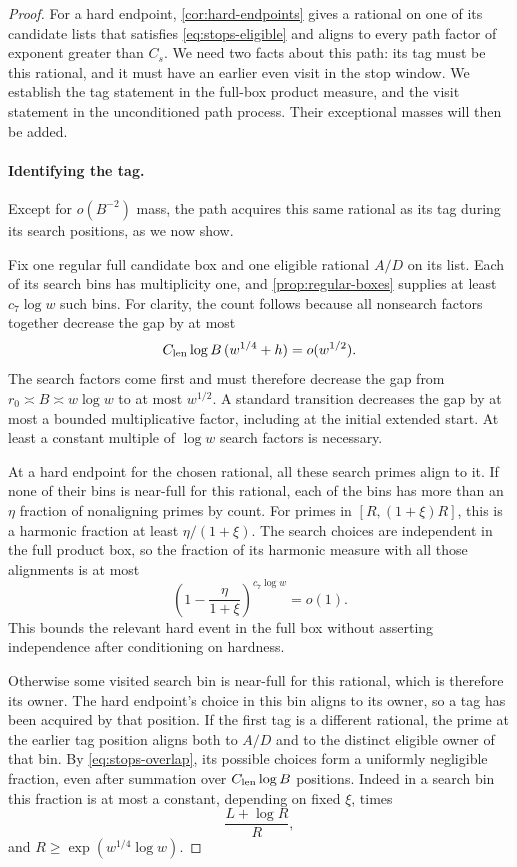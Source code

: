 \begin{proof}
For a hard endpoint, \cref{cor:hard-endpoints} gives a rational on one
of its candidate lists that satisfies \eqref{eq:stops-eligible} and
aligns to every path factor of exponent greater than $C_s$.  We need
two facts about this path: its tag must be this rational, and
it must have an earlier even visit in the stop window.  We establish
the tag statement in the full-box product measure, and the visit
statement in the unconditioned path process.  Their exceptional masses
will then be added.

\paragraph{Identifying the tag.}
Except for $o(B^{-2})$ mass, the path acquires this same rational as
its tag during its search positions, as we now show.

Fix one regular full candidate box and one eligible rational $A/D$
on its list.  Each of its search bins has multiplicity one, and
\cref{prop:regular-boxes} supplies at least $c_7\log w$ such bins.
For clarity, the count follows because all nonsearch factors together
decrease the gap by at most
\[
 C_{\rm len}\log B\,(w^{1/4}+h)=o(w^{1/2}).
\]
The search factors come first and must therefore decrease the gap from
$r_0\asymp B\asymp w\log w$ to at most $w^{1/2}$.  A standard
transition decreases the gap by at most a bounded multiplicative
factor, including at the initial extended start.  At least a constant
multiple of $\log w$ search factors is necessary.

At a hard endpoint for the chosen rational, all these search primes
align to it.  If none of their bins is near-full for this rational,
each of the bins has more than an $\eta$ fraction of nonaligning
primes by count.  For primes in $[R,(1+\xi)R]$, this is a harmonic
fraction at least $\eta/(1+\xi)$.  The search choices are independent
in the full product box, so the fraction of its harmonic measure with
all those alignments is at most
\[
 \left(1-\frac{\eta}{1+\xi}\right)^{c_7\log w}=o(1).
\]
This bounds the relevant hard event in the full box without asserting
independence after conditioning on hardness.

Otherwise some visited search bin is near-full for this rational,
which is therefore its owner.  The hard endpoint's choice in this bin
aligns to its owner, so a tag has been acquired by that position.  If
the first tag is a different rational, the prime at the earlier tag
position aligns both to $A/D$ and to the distinct eligible owner of
that bin.  By \eqref{eq:stops-overlap}, its possible choices form a
uniformly negligible fraction, even after summation over
$C_{\rm len}\log B$ positions.  Indeed in a search bin this fraction
is at most a constant, depending on fixed $\xi$, times
\[
 \frac{L+\log R}{R},
\]
and $R\ge\exp(w^{1/4}\log w)$.


\end{proof}
